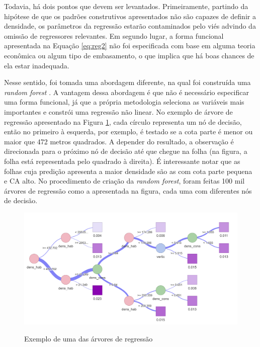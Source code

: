 Todavia, há dois pontos que devem ser levantados. Primeiramente, partindo da hipótese de que os padrões construtivos apresentados não são capazes de definir a densidade, os parâmetros da regressão estarão contaminados pelo viés advindo da omissão de regressores relevantes. Em segundo lugar, a forma funcional apresentada na Equação \ref{eq:reg2} não foi especificada com base em alguma teoria econômica ou algum tipo de embasamento, o que implica que há boas chances de ela estar inadequada.

Nesse sentido, foi tomada uma abordagem diferente, na qual foi construída uma \textit{random forest} \cite{wright2015ranger}. A vantagem dessa abordagem é que não é necessário especificar uma forma funcional, já que a própria metodologia seleciona as variáveis mais importantes e constrói uma regressão não linear. No exemplo de árvore de regressão apresentado na Figura \ref{fig:tree}, cada círculo representa um nó de decisão, então no primeiro à esquerda, por exemplo, é testado se a cota parte é menor ou maior que 472 metros quadrados. A depender do resultado, a observação é direcionada para o próximo nó de decisão até que chegue na folha (na figura, a folha está representada pelo quadrado à direita). É interessante notar que as folhas cuja predição apresenta a maior densidade são as com cota parte pequena e CA alto. No procedimento de criação da \textit{random forest}, foram feitas 100 mil árvores de regressão como a apresentada na figura, cada uma com diferentes nós de decisão. 

\begin{figure}[h]
    \centering
    \caption{Exemplo de uma das árvores de regressão}
    \includegraphics[width = \linewidth]{imagens/tree_example.png}
    \label{fig:tree}
\end{figure}

